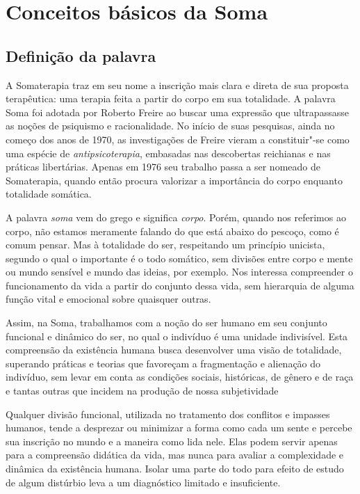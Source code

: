 \chapter{Conceitos básicos da Soma}

\section{Definição da palavra }

A Somaterapia traz em seu nome a inscrição mais clara e direta de sua
proposta terapêutica: uma terapia feita a partir do corpo em sua
totalidade. A palavra Soma foi adotada por Roberto Freire ao buscar uma
expressão que ultrapassasse as noções de psiquismo e racionalidade. No
início de suas pesquisas, ainda no começo dos anos de 1970, as investigações de
Freire vieram a constituir"-se como uma espécie de
\emph{antipsicoterapia}, embasadas nas descobertas reichianas e nas
práticas libertárias. Apenas em 1976 seu trabalho passa a ser nomeado de
Somaterapia, quando então procura valorizar a importância do corpo
enquanto totalidade somática.

A palavra \emph{soma} vem do grego e significa \emph{corpo}. Porém,
quando nos referimos ao corpo, não estamos meramente falando do que está
abaixo do pescoço, como é comum pensar. Mas à totalidade do ser,
respeitando um princípio unicista, segundo o qual o importante é o
todo somático, sem divisões entre corpo e mente ou mundo sensível e
mundo das ideias, por exemplo. Nos interessa compreender o funcionamento
da vida a partir do conjunto dessa vida, sem hierarquia de alguma função
vital e emocional sobre quaisquer outras.

Assim, na Soma, trabalhamos com a noção do ser humano em seu conjunto
funcional e dinâmico do ser, no qual o indivíduo é uma unidade
indivisível. Esta compreensão da existência humana busca desenvolver uma
visão de totalidade, superando práticas e teorias que favoreçam a
fragmentação e alienação do indivíduo, sem levar em conta as condições
sociais, históricas, de gênero e de raça e tantas outras que incidem na
produção de nossa subjetividade

Qualquer divisão funcional, utilizada no tratamento dos conflitos e
impasses humanos, tende a desprezar ou minimizar a forma como cada um
sente e percebe sua inscrição no mundo e a maneira como lida nele. Elas
podem servir apenas para a compreensão didática da vida, mas nunca para
avaliar a complexidade e dinâmica da existência humana. Isolar uma parte
do todo para efeito de estudo de algum distúrbio leva a um diagnóstico
limitado e insuficiente.

